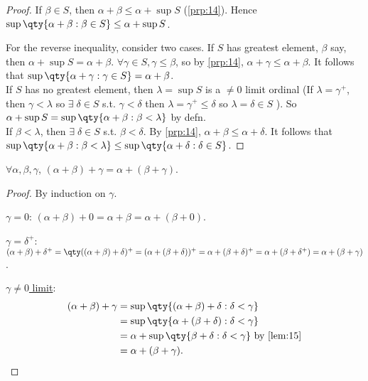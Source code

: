\begin{proof}
    If $\beta \in S$, then $\alpha + \beta \leq \alpha + \sup S$ (\cref{prp:14}).
    Hence $\sup \qty{\alpha + \beta : \beta \in S} \leq \alpha + \sup S$.

    For the reverse inequality, consider two cases.
    If $S$ has greatest element, $\beta$ say, then $\alpha + \sup S = \alpha + \beta$.
    $\forall \gamma \in S, \gamma \leq \beta$, so by \cref{prp:14}, $\alpha + \gamma \leq \alpha + \beta$.
    It follows that $\sup\qty{\alpha + \gamma : \gamma \in S} = \alpha + \beta$. \\
    If $S$ has no greatest element, then $\lambda = \sup S$ is a $\neq 0$ limit ordinal (If $\lambda = \gamma^+$, then $\gamma < \lambda$ so $\exists \; \delta \in S$ s.t. $\gamma < \delta$ then $\lambda = \gamma^+ \leq \delta$ so $\lambda = \delta \in S$ \Lightning).
    So $\alpha + \sup S = \sup \qty{\alpha + \beta : \beta < \lambda}$ by defn. \\
    If $\beta < \lambda$, then $\exists \; \delta \in S$ s.t. $\beta < \delta$.
    By \cref{prp:14}, $\alpha + \beta \leq \alpha + \delta$.
    It follows that $\sup \qty{\alpha + \beta : \beta < \lambda} \leq \sup \qty{\alpha + \delta : \delta \in S}$.
\end{proof}

\begin{proposition} \label{prp:16}
    $\forall \alpha, \beta, \gamma$, $(\alpha + \beta) + \gamma = \alpha + (\beta + \gamma)$.
\end{proposition}

\begin{proof}
    By induction on $\gamma$.

    \underline{$\gamma = 0$}: $(\alpha + \beta) + 0 = \alpha + \beta = \alpha + (\beta + 0)$.

    \underline{$\gamma = \delta^+$}: $(\alpha + \beta) + \delta^+ = \qty((\alpha + \beta) + \delta)^+ = (\alpha + (\beta + \delta))^+ = \alpha + (\beta + \delta)^+ = \alpha + (\beta + \delta^+) = \alpha + (\beta + \gamma)$.

    \underline{$\gamma \neq 0$ limit}:
    \begin{align*}
        (\alpha + \beta) + \gamma &= \sup \qty{(\alpha + \beta) + \delta : \delta < \gamma} \\
        &= \sup \qty{\alpha + (\beta + \delta) : \delta < \gamma} \\
        &= \alpha + \sup\qty{\beta + \delta : \delta < \gamma} \text{ by \cref{lem:15}} \\
        &= \alpha + (\beta + \gamma).
    \end{align*}
\end{proof}


